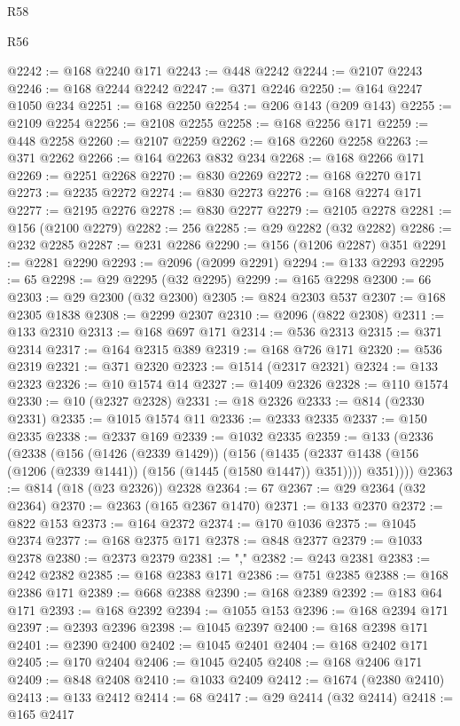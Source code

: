 \begin{lexlean}{R58}
\begin{lexlean}{R56}
\begin{coremodule}
{{{{{{{{{{{{{{{{{{{{{{{{{{{{{{{{{{{{{{{{{{{{{{{{{{{{{{{{{{{{{{{{{{{{{{{{{{{{{{{{{{{{{{{{{{{{{{{{{{{{{{{{{{{{{{{{{{{{{{{{{{{{{{{{{{{{{{{{{{{{{{{{{{{{{{{{{{{{{{{{{{{{{{{{{{{{{{{{{{{{{{{{{{{{{{{{{{{{{{{{{{{{{{{{{{{@2242 := @168 @2240 @171
@2243 := @448 @2242
@2244 := @2107 @2243
@2246 := @168 @2244 @2242
@2247 := @371 @2246
@2250 := @164 @2247 @1050 @234
@2251 := @168 @2250
@2254 := @206 @143 (@209 @143)
@2255 := @2109 @2254
@2256 := @2108 @2255
@2258 := @168 @2256 @171
@2259 := @448 @2258
@2260 := @2107 @2259
@2262 := @168 @2260 @2258
@2263 := @371 @2262
@2266 := @164 @2263 @832 @234
@2268 := @168 @2266 @171
@2269 := @2251 @2268
@2270 := @830 @2269
@2272 := @168 @2270 @171
@2273 := @2235 @2272
@2274 := @830 @2273
@2276 := @168 @2274 @171
@2277 := @2195 @2276
@2278 := @830 @2277
@2279 := @2105 @2278
@2281 := @156 (@2100 @2279)
@2282 := 256
@2285 := @29 @2282 (@32 @2282)
@2286 := @232 @2285
@2287 := @231 @2286
@2290 := @156 (@1206 @2287) @351
@2291 := @2281 @2290
@2293 := @2096 (@2099 @2291)
@2294 := @133 @2293
@2295 := 65
@2298 := @29 @2295 (@32 @2295)
@2299 := @165 @2298
@2300 := 66
@2303 := @29 @2300 (@32 @2300)
@2305 := @824 @2303 @537
@2307 := @168 @2305 @1838
@2308 := @2299 @2307
@2310 := @2096 (@822 @2308)
@2311 := @133 @2310
@2313 := @168 @697 @171
@2314 := @536 @2313
@2315 := @371 @2314
@2317 := @164 @2315 @389
@2319 := @168 @726 @171
@2320 := @536 @2319
@2321 := @371 @2320
@2323 := @1514 (@2317 @2321)
@2324 := @133 @2323
@2326 := @10 @1574 @14
@2327 := @1409 @2326
@2328 := @110 @1574
@2330 := @10 (@2327 @2328)
@2331 := @18 @2326
@2333 := @814 (@2330 @2331)
@2335 := @1015 @1574 @11
@2336 := @2333 @2335
@2337 := @150 @2335
@2338 := @2337 @169
@2339 := @1032 @2335
@2359 := @133
    (@2336
      (@2338
        (@156
          (@1426 (@2339 @1429))
          (@156
            (@1435 (@2337 @1438 (@156 (@1206 (@2339 @1441)) (@156 (@1445 (@1580 @1447)) @351))))
            @351))))
@2363 := @814 (@18 (@23 @2326)) @2328
@2364 := 67
@2367 := @29 @2364 (@32 @2364)
@2370 := @2363 (@165 @2367 @1470)
@2371 := @133 @2370
@2372 := @822 @153
@2373 := @164 @2372
@2374 := @170 @1036
@2375 := @1045 @2374
@2377 := @168 @2375 @171
@2378 := @848 @2377
@2379 := @1033 @2378
@2380 := @2373 @2379
@2381 := ","
@2382 := @243 @2381
@2383 := @242 @2382
@2385 := @168 @2383 @171
@2386 := @751 @2385
@2388 := @168 @2386 @171
@2389 := @668 @2388
@2390 := @168 @2389
@2392 := @183 @64 @171
@2393 := @168 @2392
@2394 := @1055 @153
@2396 := @168 @2394 @171
@2397 := @2393 @2396
@2398 := @1045 @2397
@2400 := @168 @2398 @171
@2401 := @2390 @2400
@2402 := @1045 @2401
@2404 := @168 @2402 @171
@2405 := @170 @2404
@2406 := @1045 @2405
@2408 := @168 @2406 @171
@2409 := @848 @2408
@2410 := @1033 @2409
@2412 := @1674 (@2380 @2410)
@2413 := @133 @2412
@2414 := 68
@2417 := @29 @2414 (@32 @2414)
@2418 := @165 @2417
}}}}}}}}}}}}}}}}}}}}}}}}}}}}}}}}}}}}}}}}}}}}}}}}}}}}}}}}}}}}}}}}}}}}}}}}}}}}}}}}}}}}}}}}}}}}}}}}}}}}}}}}}}}}}}}}}}}}}}}}}}}}}}}}}}}}}}}}}}}}}}}}}}}}}}}}}}}}}}}}}}}}}}}}}}}}}}}}}}}}}}}}}}}}}}}}}}}}}}}}}}}}}}}}}}}
\end{coremodule}
\end{lexlean}
\end{lexlean}
